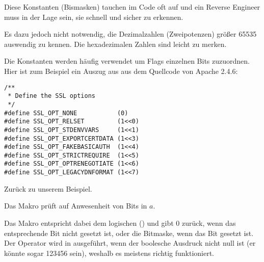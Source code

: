 \normalsize
Diese Konstanten (Bismasken) tauchen im Code oft auf und ein Reverse Engineer
muss in der Lage sein, sie schnell und sicher zu erkennen.

Es dazu jedoch nicht notwendig, die Dezimalzahlen (Zweipotenzen) größer
65535 auswendig zu kennen. Die hexadezimalen Zahlen sind leicht zu merken.

Die Konstanten werden häufig verwendet um Flags einzelnen Bits zuzuordnen. 
Hier ist zum Beispiel ein Auszug aus  aus dem Quellcode von
Apache 2.4.6:

\begin{lstlisting}[style=customc]
/**
 * Define the SSL options
 */
#define SSL_OPT_NONE           (0)
#define SSL_OPT_RELSET         (1<<0)
#define SSL_OPT_STDENVVARS     (1<<1)
#define SSL_OPT_EXPORTCERTDATA (1<<3)
#define SSL_OPT_FAKEBASICAUTH  (1<<4)
#define SSL_OPT_STRICTREQUIRE  (1<<5)
#define SSL_OPT_OPTRENEGOTIATE (1<<6)
#define SSL_OPT_LEGACYDNFORMAT (1<<7)
\end{lstlisting}

Zurück zu unserem Beispiel.

Das Makro  prüft auf Anwesenheit von Bits in $a$.

Das Makro  entspricht dabei dem logischen ()
und gibt 0 zurück, wenn das entsprechende Bit nicht gesetzt ist, oder die
Bitmaske, wenn das Bit gesetzt ist.
Der Operator  wird in \CCpp ausgeführt, wenn der boolesche Ausdruck
nicht null ist (er könnte sogar 123456 sein), weshalb es meistens richtig
funktioniert.






